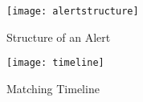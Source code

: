 %

%
%
%
%
\begin{figure}
    \texttt{[image: alertstructure]}
    \caption{Structure of an Alert}
    \label{fig:alertstructure}
\end{figure}
\begin{figure}
    \texttt{[image: timeline]}
    \caption{Matching Timeline}
    \label{fig:timeline}
\end{figure}
















